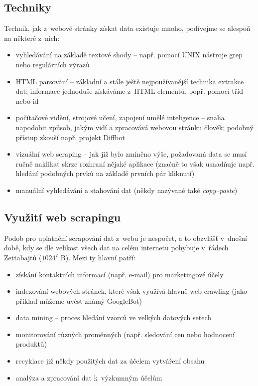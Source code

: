 \documentclass[thesis=B,czech]{FITthesis}[2012/06/26]
\begin{document}
\subsection{Techniky}
Technik, jak z~webové stránky získat data existuje mnoho, podívejme se alespoň na některé z~nich:
\begin{itemize}
	\item vyhledávání na základě textové shody -- např. pomocí UNIX nástroje grep nebo regulárních výrazů
	\item HTML parsování -- základní a stále ještě nejpoužívanější technika extrakce dat; informace jednoduše získáváme z~HTML elementů, popř. pomocí tříd nebo id
	\item počítačové vidění, strojové učení, zapojení umělé inteligence -- snaha napodobit způsob, jakým vidí a zpracovává webovou stránku člověk; podobný přístup zkouší např. projekt Diffbot \cite{computer_vision}
	\item vizuální web scraping -- jak již bylo zmíněno výše, požadovaná data se musí ručně naklikat skrze rozhraní nějaké aplikace (značně to však usnadňuje např. hledání podobných prvků na základě prvních pár kliknutí)
	\item manuální vyhledávání a stahování dat (někdy nazývané také \emph{copy--paste})
\end{itemize}

\subsection{Využití web scrapingu}
Podob pro uplatnění scrapování dat z~webu je nespočet, a to obzvlášť v~dnešní době, kdy se dle \cite{data_size} velikost všech dat na celém internetu pohybuje v~řádech Zettabajtů ($1024^{7}$ B). Mezi ty hlavní patří:
\begin{itemize}
	\item získání kontaktních informací (např. e-mail) pro marketingové účely
	\item indexování webových stránek, které však využívá hlavně web crawling (jako příklad můžeme uvést známý GoogleBot)
	\item data mining -- proces hledání vzorců ve velkých datových setech \cite{data_mining}
	\item monitorování různých proměnných (např. sledování cen nebo hodnocení produktů)
	\item recyklace již někdy použitých dat za účelem vytváření  obsahu
	\item analýza a zpracování dat k~výzkumným účelům
\end{itemize}
\end{document}
